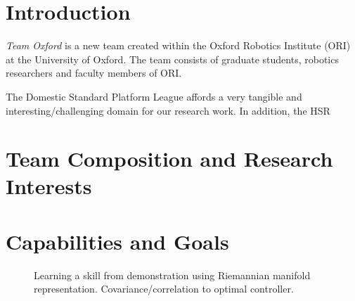 \documentclass[runningheads,a4paper]{llncs}
\begin{document}
\section{Introduction}
\textit{Team Oxford} is a new team created within the Oxford Robotics Institute
(ORI) at the University of Oxford. The team consists of graduate students,
robotics researchers and faculty members of ORI.


The Domestic Standard Platform League affords a very tangible and 
interesting/challenging domain for our research work. In addition, the HSR

\section{Team Composition and Research Interests}

\section{Capabilities and Goals}

\begin{figure}[!ht]
	\centering
	\caption{Learning a skill from demonstration using Riemannian manifold representation. Covariance/correlation to optimal controller.}
	\label{fig:baxter_water_task}
\end{figure}
\end{document}
